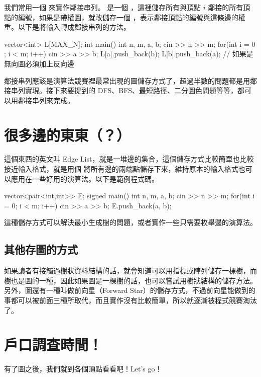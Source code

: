\documentclass[main.tex]{subfiles}
\begin{document}
我們常用一個  來實作鄰接串列。  是一個 ，這裡儲存所有與頂點 $i$ 鄰接的所有頂點的編號，如果是帶權圖，就改儲存一個 ，表示鄰接頂點的編號與這條邊的權重。以下是將輸入轉成鄰接串列的方法。

\begin{C++}
vector<int> L[MAX_N];
int main(){
    int n, m, a, b;
    cin >> n >> m;
    for(int i = 0 ; i < m; i++){
        cin >> a >> b;
        L[a].push_back(b);
        L[b].push_back(a); // 如果是無向圖必須加上反向邊
    }
}
\end{C++}

鄰接串列應該是演算法競賽裡最常出現的圖儲存方式了，超過半數的問題都是用鄰接串列實現。接下來要提到的 DFS、BFS、最短路徑、二分圖色問題等等，都可以用鄰接串列來完成。

\section{很多邊的東東（？）}
這個東西的英文叫 Edge List，就是一堆邊的集合，這個儲存方式比較簡單也比較接近輸入格式，就是用個  將所有邊的兩端點儲存下來，維持原本的輸入格式也可以應用在一些好用的演算法。以下是範例程式碼。

\begin{C++}
vector<pair<int,int>> E;
signed main(){
    int n, m, a, b;
    cin >> n >> m;
    for(int i = 0; i < m; i++){
        cin >> a >> b;
        E.push_back({a, b});
    }
}
\end{C++}

這種儲存方式可以解決最小生成樹的問題，或者實作一些只需要枚舉邊的演算法。

\subsection{其他存圖的方式}
如果讀者有接觸過樹狀資料結構的話，就會知道可以用指標或陣列儲存一棵樹，而樹也是圖的一種，因此如果圖是一棵樹的話，也可以嘗試用樹狀結構的儲存方法。\\

另外，圖還有一種叫做前向星（Forward Star）的儲存方式，不過前向星能做到的事都可以被前面三種所取代，而且實作沒有比較簡單，所以就逐漸被程式競賽淘汰了。

\section{戶口調查時間！}
有了圖之後，我們就到各個頂點看看吧！Let's go！\\
\end{document}
